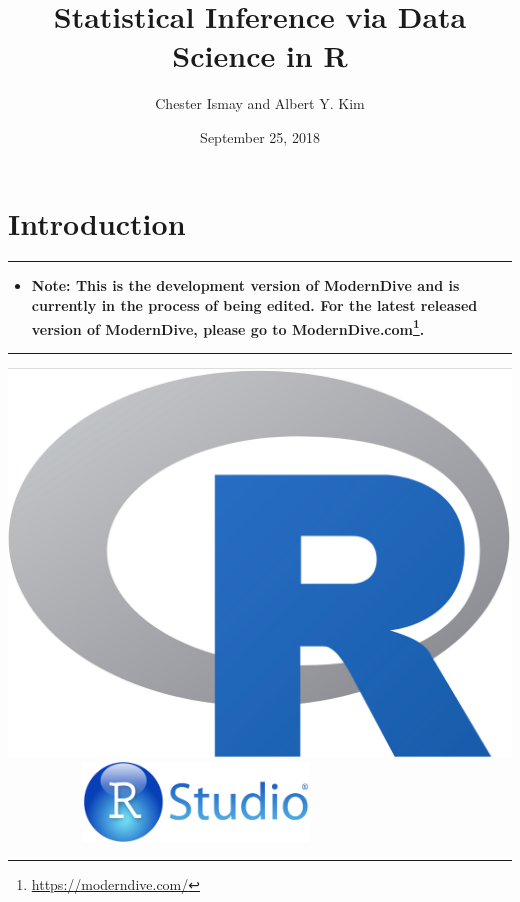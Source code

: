 \documentclass[12pt,]{krantz}
\title{Statistical Inference via Data Science in R}
\author{Chester Ismay and Albert Y. Kim}
\date{September 25, 2018}
\renewcommand{\href}[2]{#2\footnote{\url{#1}}}
\newenvironment{rmdblock}[1]
  {\begin{shaded*}
  \begin{itemize}
  \renewcommand{\labelitemi}{
    \raisebox{-.7\height}[0pt][0pt]{
    }
  }
  \item
  }
  {
  \end{itemize}
  \end{shaded*}
  }
\newenvironment{learncheck}
  {\begin{rmdblock}{warning}}
  {\end{rmdblock}}
\theoremstyle{definition}
\theoremstyle{definition}
\theoremstyle{definition}
\theoremstyle{remark}
\begin{document}
\maketitle


\thispagestyle{empty}

\begin{center}
\end{center}

\setlength{\abovedisplayskip}{-5pt}
\setlength{\abovedisplayshortskip}{-5pt}

{
\hypersetup{linkcolor=black}
\setcounter{tocdepth}{2}
\tableofcontents
}
\listoftables
\listoffigures
\mainmatter

\chapter{Introduction}\label{intro}

\begin{center}\rule{0.5\linewidth}{\linethickness}\end{center}

\begin{learncheck}
\textbf{Note: This is the development version of ModernDive and is
currently in the process of being edited. For the latest released
version of ModernDive, please go to
\href{https://moderndive.com/}{ModernDive.com}.}
\end{learncheck}

\begin{center}\rule{0.5\linewidth}{\linethickness}\end{center}

\includegraphics[height=0.20000\textwidth]{images/Rlogo.png} \hfill    
   
\includegraphics[width=0.45000\textwidth]{images/RStudio-Logo-Blue-Gradient.png}
\end{document}
